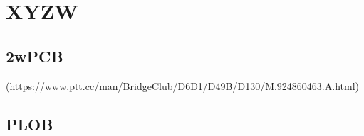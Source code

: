 \section{XYZW}

\subsection{2wPCB}

(https://www.ptt.cc/man/BridgeClub/D6D1/D49B/D130/M.924860463.A.html)


\subsection{PLOB}

